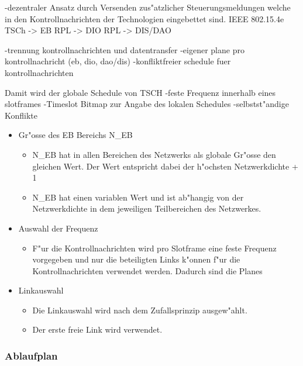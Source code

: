 -dezentraler Ansatz durch Versenden zus"atzlicher Steuerungsmeldungen
welche in den Kontrollnachrichten der Technologien eingebettet sind.
IEEE 802.15.4e TSCh -> EB
RPL -> DIO
RPL -> DIS/DAO

-trennung kontrollnachrichten und datentransfer
-eigener plane pro kontrollnachricht (eb, dio, dao/dis)
-konfliktfreier schedule fuer kontrollnachrichten

 Damit wird der globale Schedule von TSCH
-feste Frequenz innerhalb eines slotframes
-Timeslot Bitmap zur Angabe des lokalen Schedules
-selbstst"andige Konflikte




\begin{itemize}
  \item Gr"osse des EB Bereichs N\_EB
    \begin{itemize}
      \item N\_EB hat in allen Bereichen des Netzwerks als globale Gr"osse
      den gleichen Wert. Der Wert entspricht dabei der h"ochsten Netzwerkdichte + 1
      \item N\_EB hat einen variablen Wert und ist ab"hangig von der Netzwerkdichte
      in dem jeweiligen Teilbereichen des Netzwerkes.
    \end{itemize}
  \item Auswahl der Frequenz
    \begin{itemize}
      \item F"ur die Kontrollnachrichten wird pro Slotframe eine feste Frequenz vorgegeben
      und nur die beteiligten Links k"onnen f"ur die Kontrollnachrichten verwendet werden.
      Dadurch sind die Planes
    \end{itemize}

  \item Linkauswahl
    \begin{itemize}
      \item Die Linkauswahl wird nach dem Zufallsprinzip ausgew"ahlt.
      \item Der erste freie Link wird verwendet.
    \end{itemize}

\end{itemize}

\subsubsection{Ablaufplan}
\label{subsubsec:di_ablaufplan}

